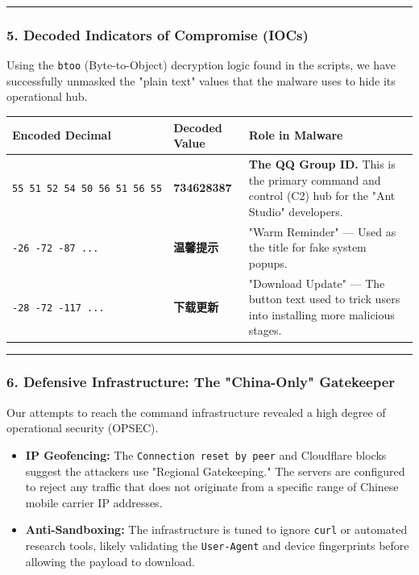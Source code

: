 \documentclass[
]{article}
\begin{document}
\begin{center}\rule{0.5\linewidth}{0.5pt}\end{center}

\subsubsection{5. Decoded Indicators of Compromise
(IOCs)}\label{5-decoded-indicators-of-compromise-iocs}

Using the \texttt{btoo} (Byte-to-Object) decryption logic found in the
scripts, we have successfully unmasked the "plain text" values that the
malware uses to hide its operational hub.

\begin{longtable}[]{@{}lll@{}}
\toprule\noalign{}
Encoded Decimal & Decoded Value & Role in Malware \\
\midrule\noalign{}
\endhead
\bottomrule\noalign{}
\endlastfoot
\texttt{55\ 51\ 52\ 54\ 50\ 56\ 51\ 56\ 55} & \textbf{734628387} &
\textbf{The QQ Group ID.} This is the primary command and control (C2)
hub for the "Ant Studio" developers. \\
\texttt{-26\ -72\ -87\ ...} & \textbf{温馨提示} & "Warm Reminder" ---
Used as the title for fake system popups. \\
\texttt{-28\ -72\ -117\ ...} & \textbf{下载更新} & "Download Update" ---
The button text used to trick users into installing more malicious
stages. \\
\end{longtable}

\begin{center}\rule{0.5\linewidth}{0.5pt}\end{center}

\subsubsection{6. Defensive Infrastructure: The "China-Only"
Gatekeeper}\label{6-defensive-infrastructure-the-china-only-gatekeeper}

Our attempts to reach the command infrastructure revealed a high degree
of operational security (OPSEC).

\begin{itemize}
\item
  \textbf{IP Geofencing:} The \texttt{Connection\ reset\ by\ peer} and
  Cloudflare blocks suggest the attackers use "Regional Gatekeeping."
  The servers are configured to reject any traffic that does not
  originate from a specific range of Chinese mobile carrier IP
  addresses.
\item
  \textbf{Anti-Sandboxing:} The infrastructure is tuned to ignore
  \texttt{curl} or automated research tools, likely validating the
  \texttt{User-Agent} and device fingerprints before allowing the
  payload to download.
\end{itemize}
\end{document}
